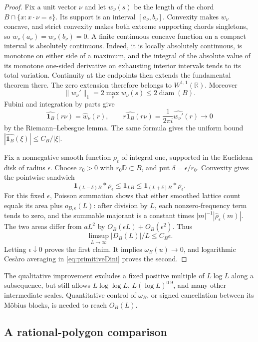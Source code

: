\begin{proof}
Fix a unit vector $\nu$ and let $w_\nu(s)$ be the length of the
chord $B\cap\{x:x\cdot\nu=s\}$. Its support is an interval
$[a_\nu,b_\nu]$. Convexity makes $w_\nu$ concave, and strict
convexity makes both extreme supporting chords singletons, so
$w_\nu(a_\nu)=w_\nu(b_\nu)=0$. A finite continuous concave
function on a compact interval is absolutely continuous. Indeed, it is
locally absolutely continuous, is monotone on either side of a maximum,
and the integral of the absolute value of its monotone one-sided
derivative on exhausting interior intervals tends to its total variation.
Continuity at the endpoints then extends the fundamental theorem there.
The zero extension therefore belongs to $W^{1,1}(\mathbb R)$.
Moreover
\[
 \|w_\nu'\|_1=2\max_s w_\nu(s)\le2\operatorname{diam}(B).
\]
Fubini and integration by parts give
\[
 \widehat{\mathbf1_B}(r\nu)=\widehat w_\nu(r),\qquad
 r\widehat{\mathbf1_B}(r\nu)
   =\frac1{2\pi i}\widehat{w_\nu'}(r)\longrightarrow0
\]
by the Riemann--Lebesgue lemma. The same formula gives the uniform
bound $|\widehat{\mathbf1_B}(\xi)|\le C_B/|\xi|$.

Fix a nonnegative smooth function $\rho_\epsilon$ of integral one,
supported in the Euclidean disk of radius $\epsilon$. Choose $r_0>0$
with $r_0\mathbb D\subset B$, and put $\delta=\epsilon/r_0$.
Convexity gives the pointwise sandwich
\[
 \mathbf1_{(L-\delta)B}*\rho_\epsilon
 \le\mathbf1_{LB}
 \le\mathbf1_{(L+\delta)B}*\rho_\epsilon.
\]
For this fixed $\epsilon$, Poisson summation shows that either
smoothed lattice count equals its area plus $o_{B,\epsilon}(L)$: after division
by $L$, each nonzero-frequency term tends to zero, and the summable
majorant is a constant times
$|m|^{-1}|\widehat\rho_\epsilon(m)|$.
The two areas differ from $aL^2$ by $O_B(\epsilon L)+O_B(\epsilon^2)$.
Thus
\[
 \limsup_{L\to\infty}|D_B(L)|/L\le C_B\epsilon.
\]
Letting $\epsilon\downarrow0$ proves the first claim. It implies
$\omega_B(u)\to0$, and logarithmic Ces\`aro averaging in
\eqref{eq:primitiveDini} proves the second.
\end{proof}

The qualitative improvement excludes a fixed positive multiple of
$L\log L$ along a subsequence, but still allows $L\log\log L$,
$L(\log L)^{0.9}$, and many other intermediate scales. Quantitative
control of $\omega_B$, or signed cancellation between its M\"obius
blocks, is needed to reach $O_B(L)$.

\subsection{A rational-polygon comparison}
\label{subsec:rationalpolygonbenchmark}

